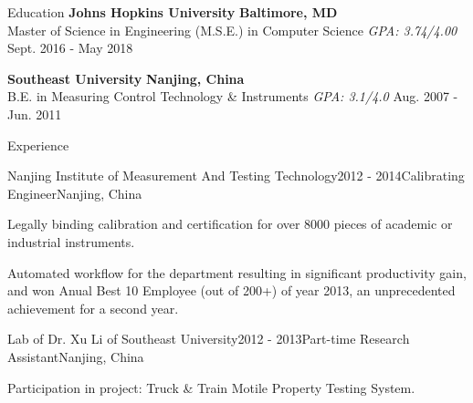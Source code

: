 \documentclass{resume} %
\begin{document}

\begin{rSection}{Education}
{\bf Johns Hopkins University} \hfill {\bf Baltimore, MD} \\
{Master of Science in Engineering (M.S.E.) in Computer Science} {\em GPA: 3.74/4.00} \hfill {Sept. 2016 - May 2018}

{\bf Southeast University} \hfill {\bf Nanjing, China} \\
{B.E. in Measuring Control Technology \& Instruments} {\em GPA: 3.1/4.0} \hfill {Aug. 2007 - Jun. 2011}
\end{rSection}



\begin{rSection}{Experience}

\begin{rSubsection}{Nanjing Institute of Measurement And Testing Technology}{2012 - 2014}{Calibrating Engineer}{Nanjing, China}
\item Legally binding calibration and certification for over 8000 pieces of academic or industrial instruments.
\item Automated workflow for the department resulting in significant productivity gain, and won Anual Best 10 Employee (out of 200+) of year 2013, an unprecedented achievement for a second year.
\end{rSubsection}

\begin{rSubsection}{Lab of Dr. Xu Li of Southeast University}{2012 - 2013}{Part-time Research Assistant}{Nanjing, China}
\item Participation in project: Truck \& Train Motile Property Testing System.
\end{rSubsection}
\end{rSection}
\end{document}
